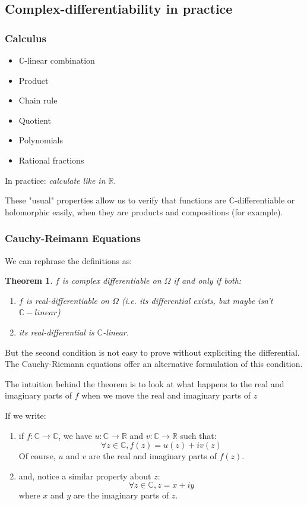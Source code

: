 \documentclass{article}
\newtheorem*{thm*}{Theorem}
\begin{document}
\subsection{Complex-differentiability in practice}

\subsubsection{Calculus}
\begin{itemize}
    \item $\mathbb{C}$-linear combination
    \item Product
    \item Chain rule
    \item Quotient
    \item Polynomials
    \item Rational fractions
\end{itemize}

In practice: \emph{calculate like in $\mathbb{R}$}.

These "usual" properties allow us to verify that functions are $\mathbb{C}$-differentiable or holomorphic easily, when they are products and compositions (for example).

\subsubsection{Cauchy-Reimann Equations}

We can rephrase the definitions as:
\begin{thm*}
$f$ is complex differentiable on $\Omega$ if and only if both:
\begin{enumerate}
    \item $f$ is real-differentiable on $\Omega$ (i.e. its differential exists, but maybe isn't $\mathbb{C}-linear$)
    \item its real-differential is $\mathbb{C}$-linear.
\end{enumerate}
\end{thm*}

But the second condition is not easy to prove without expliciting the differential. The Cauchy-Riemann equations offer an alternative formulation of this condition.

The intuition behind the theorem is to look at what happens to the real and imaginary parts of $f$ when we move the real and imaginary parts of $z$

If we write:
\begin{enumerate}
    \item if $f: \mathbb{C} \rightarrow \mathbb{C}$, we have $u: \mathbb{C} \rightarrow \mathbb{R}$ and $v: \mathbb{C} \rightarrow \mathbb{R}$ such that:
$$ \forall z \in \mathbb{C}, f(z) = u(z) + iv(z)$$
Of course, $u$ and $v$ are the real and imaginary parts of $f(z)$.

\item and, notice a similar property about $z$:  $$\forall z \in \mathbb{C}, z = x + iy$$ where $x$ and $y$ are the imaginary parts of $z$.
\end{enumerate}
\end{document}

